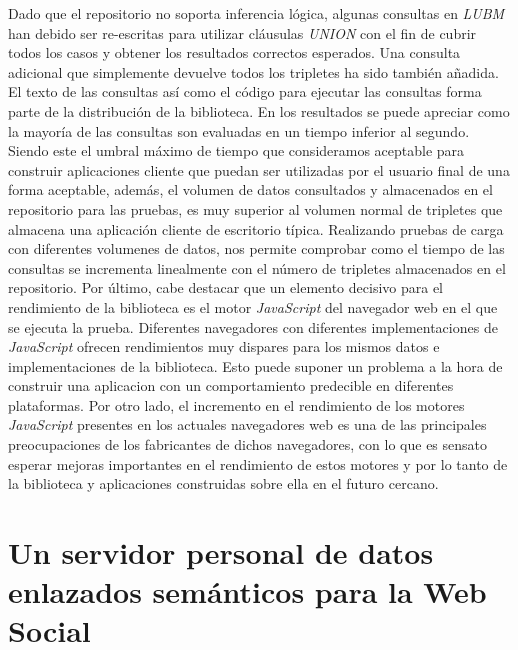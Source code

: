  Dado que el repositorio no soporta inferencia l\'ogica, algunas consultas en \textit{LUBM} han debido ser re-escritas para utilizar cl\'ausulas \textit{UNION} con el fin de cubrir todos los casos y obtener los resultados correctos esperados. Una consulta adicional que simplemente devuelve todos los tripletes ha sido tambi\'en a\~nadida. El texto de las consultas as\'i como el c\'odigo para ejecutar las consultas forma parte de la distribuci\'on de la biblioteca.
En los resultados se puede apreciar como la mayor\'ia de las consultas son evaluadas en un tiempo inferior al segundo. Siendo este el umbral m\'aximo de tiempo que consideramos aceptable para construir aplicaciones cliente que puedan ser utilizadas por el usuario final de una forma aceptable, adem\'as, el volumen de datos consultados y almacenados en el repositorio para las pruebas, es muy superior al volumen normal de tripletes que almacena una aplicaci\'on cliente de escritorio t\'ipica.
Realizando pruebas de carga con diferentes volumenes de datos, nos permite comprobar como el tiempo de las consultas se incrementa linealmente con el n\'umero de tripletes almacenados en el repositorio. Por \'ultimo, cabe destacar que un elemento decisivo para el rendimiento de la biblioteca es el motor \textit{JavaScript} del navegador web en el que se ejecuta la prueba. Diferentes navegadores con diferentes implementaciones de \textit{JavaScript} ofrecen rendimientos muy dispares para los mismos datos e implementaciones de la biblioteca. Esto puede suponer un problema a la hora de construir una aplicacion con un comportamiento predecible en diferentes plataformas. Por otro lado, el incremento en el rendimiento de los motores \textit{JavaScript} presentes en los actuales navegadores web es una de las principales preocupaciones de los fabricantes de dichos navegadores, con lo que es sensato esperar mejoras importantes en el rendimiento de estos motores y por lo tanto de la biblioteca y aplicaciones construidas sobre ella en el futuro cercano.


\section{Un servidor personal de datos enlazados sem\'anticos para la Web Social}

